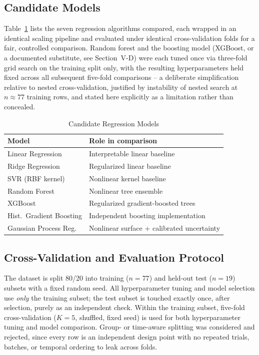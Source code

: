 \documentclass[conference]{IEEEtran}
\begin{document}
\subsection{Candidate Models}
Table~\ref{tab:models} lists the seven regression algorithms compared, each wrapped in an identical scaling pipeline and evaluated under identical cross-validation folds for a fair, controlled comparison. Random forest and the boosting model (XGBoost, or a documented substitute, see Section~V-D) were each tuned once via three-fold grid search on the training split only, with the resulting hyperparameters held fixed across all subsequent five-fold comparisons -- a deliberate simplification relative to nested cross-validation, justified by instability of nested search at $n\approx77$ training rows, and stated here explicitly as a limitation rather than concealed.

\begin{table}[!t]
\caption{Candidate Regression Models}
\label{tab:models}
\centering
\footnotesize
\setlength{\tabcolsep}{3pt}
\begin{tabular}{@{}ll@{}}
\toprule
\textbf{Model} & \textbf{Role in comparison} \\
\midrule
Linear Regression & Interpretable linear baseline \\
Ridge Regression & Regularized linear baseline \\
SVR (RBF kernel) & Nonlinear kernel baseline \\
Random Forest \cite{breiman2001} & Nonlinear tree ensemble \\
XGBoost \cite{chen2016} & Regularized gradient-boosted trees \\
Hist.\ Gradient Boosting & Independent boosting implementation \\
Gaussian Process Reg. \cite{rasmussen2006} & Nonlinear surface + calibrated uncertainty \\
\bottomrule
\end{tabular}
\end{table}

\subsection{Cross-Validation and Evaluation Protocol}
The dataset is split 80/20 into training ($n=77$) and held-out test ($n=19$) subsets with a fixed random seed. All hyperparameter tuning and model selection use \emph{only} the training subset; the test subset is touched exactly once, after selection, purely as an independent check. Within the training subset, five-fold cross-validation ($K=5$, shuffled, fixed seed) is used for both hyperparameter tuning and model comparison. Group- or time-aware splitting was considered and rejected, since every row is an independent design point with no repeated trials, batches, or temporal ordering to leak across folds.
\end{document}

